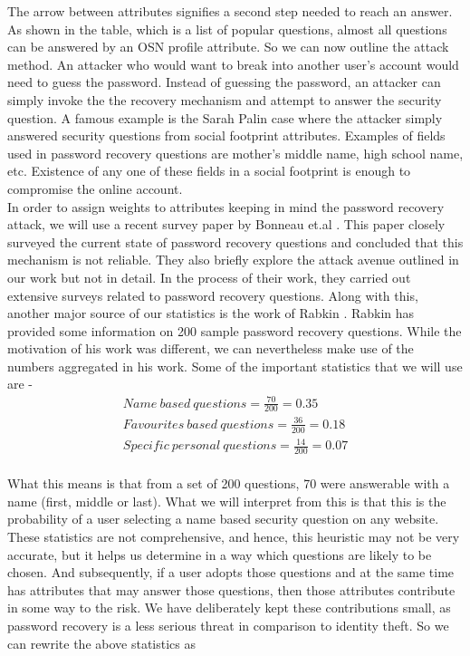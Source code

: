 \documentclass[10pt,conference]{IEEEtran}
\begin{document}
The arrow between attributes signifies a second step needed to reach an answer. As shown in the table, which is a list of popular questions, almost all questions can be answered by an OSN profile attribute. So we can now outline the attack method. An attacker who would want to break into another user's account would need to guess the password. Instead of guessing the password, an attacker can simply invoke the the recovery mechanism and attempt to answer the security question. A famous example is the Sarah Palin case where the attacker simply answered security questions from social footprint attributes. Examples of fields used in password recovery questions are mother’s middle name, high school name, etc. Existence of any one of these fields in a social footprint is enough to compromise the online account. \\

In order to assign weights to attributes keeping in mind the password recovery attack, we will use a recent survey paper by Bonneau et.al \cite{google}. This paper closely surveyed the current state of password recovery questions and concluded that this mechanism is not reliable. They also briefly explore the attack avenue outlined in our work but not in detail. In the process of their work, they carried out extensive surveys related to password recovery questions. Along with this, another major source of our statistics is the work of Rabkin \cite{recovery}. Rabkin has provided some information on 200 sample password recovery questions. While the motivation of his work was different, we can nevertheless make use of the numbers aggregated in his work. Some of the important statistics that we will use are - \\

\begin{align*}
Name\ based\  questions = \frac{70}{200} = 0.35 \\
Favourites\ based\ questions = \frac{36}{200} = 0.18 \\
Specific\ personal\ questions = \frac{14}{200} = 0.07 \\
\end{align*}

What this means is that from a set of 200 questions, 70 were answerable with a name (first, middle or last). What we will interpret from this is that this is the probability of a user selecting a name based security question on any website. These statistics are not comprehensive, and hence, this heuristic may not be very accurate, but it helps us determine in a way which questions are likely to be chosen. And subsequently, if a user adopts those questions and at the same time has attributes that may answer those questions, then those attributes contribute in some way to the risk. We have deliberately kept these contributions small, as password recovery is a less serious threat in comparison to identity theft. So we can rewrite the above statistics as 
\end{document}

